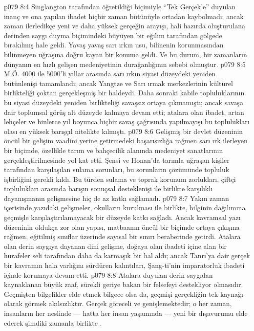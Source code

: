 \vs p079 8:4 Singlangton tarafından öğretildiği biçimiyle “Tek Gerçek’e” duyulan inanç ve ona yapılan ibadet hiçbir zaman bütünüyle ortadan kaybolmadı; ancak zaman ilerledikçe yeni ve daha yüksek gerçeğin arayışı, hali hazırda oluşturulana derinden saygı duyma biçimindeki büyüyen bir eğilim tarafından gölgede bırakılmış hale geldi. Yavaş yavaş sarı ırkın usu, bilinenin korunmasından bilinmeyen uğraşına doğru kayan bir konuma geldi. Ve bu durum, bir zamanların dünyanın en hızlı gelişen medeniyetinin durağanlığının sebebi olmuştur.
\vs p079 8:5 M.Ö. 4000 ile 5000’li yıllar arasında sarı ırkın siyasi düzeydeki yeniden bütünlenişi tamamlandı; ancak Yangtze ve Sarı ırmak merkezlerinin kültürel birlikteliği çoktan gerçekleşmiş bir haldeydi. Daha sonraki kabile topluluklarının bu siyasi düzeydeki yeniden birlikteliği savaşsız ortaya çıkmamıştı; ancak savaşa dair toplumsal görüş alt düzeyde kalmaya devam etti; atalara olan ibadet, artan lehçeler ve binlerce yıl boyunca hiçbir savaş çağrısında yapılmayışı bu toplulukları olası en yüksek barışçıl nitelikte kılmıştı.
\vs p079 8:6 Gelişmiş bir devlet düzeninin öncül bir gelişim vaadini yerine getirmedeki başarısızlığa rağmen sarı ırk ilerleyen bir biçimde, özellikle tarım ve bahçecilik alanında medeniyet sanatlarının gerçekleştirilmesinde yol kat etti. Şensi ve Honan’da tarımla uğraşan kişiler tarafından karşılaşılan sulama sorunları, bu sorunların çözümünde topluluk işbirliğini gerekli kıldı. Bu türden sulama ve toprak korunum zorlukları, çiftçi toplulukları arasında barışın sonuçsal desteklenişi ile birlikte karşılıklı dayanışmanın gelişmesine hiç de az katkı sağlamadı.
\vs p079 8:7 Yakın zaman içerisinde yazıdaki gelişmeler, okulların kurulması ile birlikte, bilginin dağılımına geçmişle karşılaştırılamayacak bir düzeyde katkı sağladı. Ancak kavramsal yazı düzeninin oldukça zor olan yapısı, matbaanın öncül bir biçimde ortaya çıkışına rağmen, eğitilmiş sınıflar üzerinde sayısal bir sınırı beraberinde getirdi. Atalara olan derin saygıya dayanan dini gelişme, doğaya olan ibadeti içine alan bir hurafeler seli tarafından daha da karmaşık bir hal aldı; ancak Tanrı’ya dair gerçek bir kavramın hala varlığını sürdüren kalıntıları, Şang\hyp{}ti’nin imparatorluk ibadeti içinde korumaya devam etti.
\vs p079 8:8 Atalara duyulan derin saygıdan kaynaklanan büyük zaaf, sürekli geriye bakan bir felsefeyi destekliyor olmasıdır. Geçmişten bilgelikler elde etmek bilgece olsa da, geçmişi gerçekliğin tek kaynağı olarak görmek akılsızlıktır. Gerçek göreceli ve genişlemektedir; o her zaman, insanların her neslinde --- hatta her insan yaşamında --- yeni bir dışavurumu elde ederek şimdiki zamanla birlikte .
